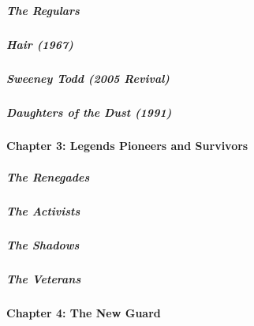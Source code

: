 \hypertarget{the-regulars}{%
\subparagraph{The Regulars}\label{the-regulars}}

\href{/interactive/2020/04/13/t-magazine/hair-musical-broadway.html}{}

\hypertarget{hair-1967}{%
\subparagraph{Hair (1967)}\label{hair-1967}}

\href{/interactive/2020/04/13/t-magazine/sweeney-todd-revival.html}{}

\hypertarget{sweeney-todd-2005-revival}{%
\subparagraph{Sweeney Todd (2005
Revival)}\label{sweeney-todd-2005-revival}}

\href{/interactive/2020/04/13/t-magazine/daughters-of-the-dust.html}{}

\hypertarget{daughters-of-the-dust-1991}{%
\subparagraph{Daughters of the Dust
(1991)}\label{daughters-of-the-dust-1991}}

\hypertarget{chapter-3-legends-pioneers-and-survivors}{%
\paragraph{Chapter 3: Legends Pioneers and
Survivors}\label{chapter-3-legends-pioneers-and-survivors}}

\href{/interactive/2020/04/13/t-magazine/butch-stud-lesbian.html}{}

\hypertarget{the-renegades}{%
\subparagraph{The Renegades}\label{the-renegades}}

\href{/interactive/2020/04/13/t-magazine/act-up-aids.html}{}

\hypertarget{the-activists}{%
\subparagraph{The Activists}\label{the-activists}}

\href{/interactive/2020/04/13/t-magazine/artist-recluse.html}{}

\hypertarget{the-shadows}{%
\subparagraph{The Shadows}\label{the-shadows}}

\href{/interactive/2020/04/13/t-magazine/black-actresses-bassett-berry-blige-henson-whitfield-elise.html}{}

\hypertarget{the-veterans}{%
\subparagraph{The Veterans}\label{the-veterans}}

\hypertarget{chapter-4-the-new-guard}{%
\paragraph{Chapter 4: The New Guard}\label{chapter-4-the-new-guard}}

\href{/interactive/2020/04/13/t-magazine/asian-american-fashion-designers.html}{}

